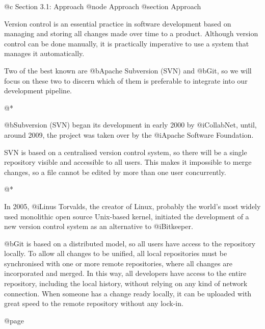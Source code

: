 @c Section 3.1: Approach
@node Approach
@section Approach

Version control is an essential practice in software development based on managing and storing all changes made over time to a product.
Although version control can be done manually, it is practically imperative to use a system that manages it automatically.

Two of the best known are @b{Apache Subversion (SVN)} and @b{Git}, so we will focus on these two to discern which of them is preferable to integrate into our development pipeline.

@*

@b{Subversion (SVN)} began its development in early 2000 by @i{CollabNet}, until, around 2009, the project was taken over by the @i{Apache Software Foundation}.

SVN is based on a centralised version control system, so there will be a single repository visible and accessible to all users. This makes it impossible to merge changes, so a file cannot be edited by more than one user concurrently.

@*

In 2005, @i{Linus Torvalds}, the creator of Linux, probably the world's most widely used monolithic open source Unix-based kernel, initiated the development of a new version control system as an alternative to @i{Bitkeeper}.

@b{Git} is based on a distributed model, so all users have access to the repository locally. To allow all changes to be unified, all local repositories must be synchronised with one or more remote repositories, where all changes are incorporated and merged.
In this way, all developers have access to the entire repository, including the local history, without relying on any kind of network connection. When someone has a change ready locally, it can be uploaded with great speed to the remote repository without any lock-in.

@page
